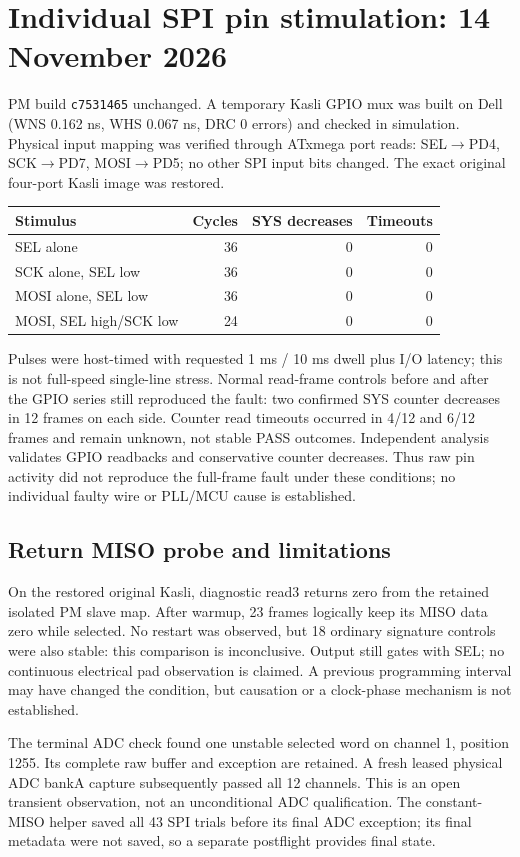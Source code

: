 \clearpage
\section{Individual SPI pin stimulation: 14 November 2026}
PM build \texttt{c7531465} unchanged. A temporary Kasli GPIO mux was built
on Dell (WNS 0.162 ns, WHS 0.067 ns, DRC 0 errors) and checked in simulation.
Physical input mapping was verified through ATxmega port reads:
SEL$\rightarrow$PD4, SCK$\rightarrow$PD7, MOSI$\rightarrow$PD5; no other
SPI input bits changed. The exact original four-port Kasli image was restored.
\begin{center}\begin{tabular}{lrrr}\toprule
Stimulus & Cycles & SYS decreases & Timeouts\\\midrule
SEL alone &36&0&0\\
SCK alone, SEL low &36&0&0\\
MOSI alone, SEL low &36&0&0\\
MOSI, SEL high/SCK low &24&0&0\\\bottomrule\end{tabular}\end{center}
Pulses were host-timed with requested 1 ms / 10 ms dwell plus I/O latency;
this is not full-speed single-line stress. Normal read-frame controls before
and after the GPIO series still reproduced the fault: two confirmed SYS
counter decreases in 12 frames on each side. Counter read timeouts occurred
in 4/12 and 6/12 frames and remain unknown, not stable PASS outcomes.
Independent analysis validates GPIO readbacks and conservative counter decreases.
Thus raw pin activity did not reproduce the full-frame fault under these
conditions; no individual faulty wire or PLL/MCU cause is established.

\subsection{Return MISO probe and limitations}
On the restored original Kasli, diagnostic read3 returns zero from the
retained isolated PM slave map. After warmup, 23 frames logically keep its
MISO data zero while selected. No restart was observed, but 18 ordinary
signature controls were also stable: this comparison is inconclusive.
Output still gates with SEL; no continuous electrical pad observation is claimed.
A previous programming interval may have changed the condition, but causation
or a clock-phase mechanism is not established.

The terminal ADC check found one unstable selected word on channel 1,
position 1255. Its complete raw buffer and exception are retained. A fresh
leased physical ADC bankA capture subsequently passed all 12 channels.
This is an open transient observation, not an unconditional ADC qualification.
The constant-MISO helper saved all 43 SPI trials before its final ADC exception;
its final metadata were not saved, so a separate postflight provides final state.

